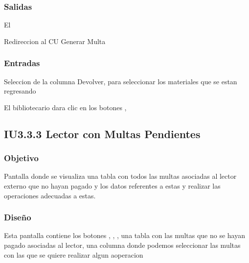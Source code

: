 
\subsubsection{Salidas}
	\begin{Citemize}
		\item El 
		\item Redireccion al CU Generar Multa
	\end{Citemize}
	
\subsubsection{Entradas}
	\begin{Citemize}
		\item Seleccion de la columna Devolver, para seleccionar los materiales que se estan regresando
		\item El bibliotecario dara clic en los botones ,\IUbutton{Generar Multa}
	\end{Citemize}

\newpage
\subsection{IU3.3.3 Lector con Multas Pendientes}

\subsubsection{Objetivo}
	Pantalla donde se visualiza una tabla con todos las multas asociadas al lector externo que no hayan pagado y los datos referentes a estas y realizar las operaciones adecuadas a estas.

\subsubsection{Diseño}
	Esta pantalla contiene los botones , , , una tabla con las multas que no se hayan pagado asociadas al lector, una columna donde podemos seleccionar las multas con las que se quiere realizar algun aoperacion \\\\


